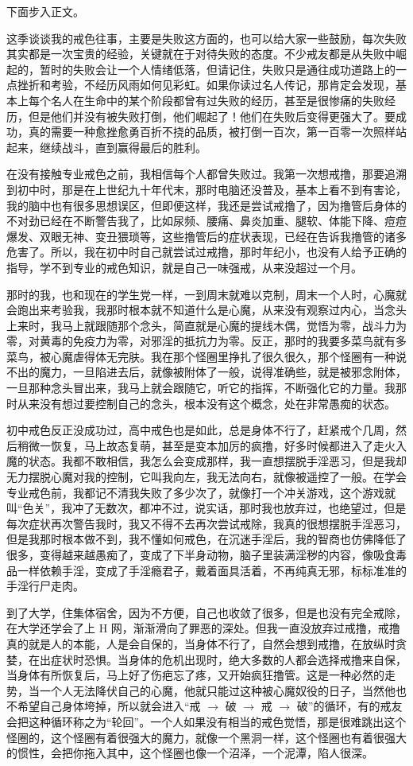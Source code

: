 下面步入正文。

这季谈谈我的戒色往事，主要是失败这方面的，也可以给大家一些鼓励，每次失败其实都是一次宝贵的经验，关键就在于对待失败的态度。不少戒友都是从失败中崛起的，暂时的失败会让一个人情绪低落，但请记住，失败只是通往成功道路上的一点挫折和考验，不经历风雨如何见彩虹。如果你读过名人传记，那肯定会发现，基本上每个名人在生命中的某个阶段都曾有过失败的经历，甚至是很惨痛的失败经历，但是他们并没有被失败打倒，他们崛起了！他们在失败后变得更强大了。要成功，真的需要一种愈挫愈勇百折不挠的品质，被打倒一百次，第一百零一次照样站起来，继续战斗，直到赢得最后的胜利。

在没有接触专业戒色之前，我相信每个人都曾失败过。我第一次想戒撸，那要追溯到初中时，那是在上世纪九十年代末，那时电脑还没普及，基本上看不到有害论，我的脑中也有很多思想误区，但即便这样，我还是尝试戒撸了，因为撸管后身体的不对劲已经在不断警告我了，比如尿频、腰痛、鼻炎加重、腿软、体能下降、痘痘爆发、双眼无神、变丑猥琐等，这些撸管后的症状表现，已经在告诉我撸管的诸多危害了。所以，我在初中时自己就尝试过戒撸，那时年纪小，也没有人给予正确的指导，学不到专业的戒色知识，就是自己一味强戒，从来没超过一个月。

那时的我，也和现在的学生党一样，一到周末就难以克制，周末一个人时，心魔就会跑出来考验我，我那时根本就不知道什么是心魔，从来没有观察过内心，当念头上来时，我马上就跟随那个念头，简直就是心魔的提线木偶，觉悟为零，战斗力为零，对黄毒的免疫力为零，对邪淫的抵抗力为零。反正，那时的我要多菜鸟就有多菜鸟，被心魔虐得体无完肤。我在那个怪圈里挣扎了很久很久，那个怪圈有一种说不出的魔力，一旦陷进去后，就像被附体了一般，说得准确些，就是被邪念附体，一旦那种念头冒出来，我马上就会跟随它，听它的指挥，不断强化它的力量。我那时从来没有想过要控制自己的念头，根本没有这个概念，处在非常愚痴的状态。

初中戒色反正没成功过，高中戒色也是如此，总是身体不行了，赶紧戒个几周，然后稍微一恢复，马上故态复萌，甚至是变本加厉的疯撸，好多时候都进入了走火入魔的状态。我都不敢相信，我怎么会变成那样，我一直想摆脱手淫恶习，但是我却无力摆脱心魔对我的控制，它叫我向左，我无法向右，就像被遥控了一般。在学会专业戒色前，我都记不清我失败了多少次了，就像打一个冲关游戏，这个游戏就叫“色关”，我冲了无数次，都冲不过，说实话，那时我也放弃过，也绝望过，但是每次症状再次警告我时，我又不得不去再次尝试戒除，我真的很想摆脱手淫恶习，但是我那时根本做不到，我不懂如何戒色，在沉迷手淫后，我的智商也仿佛降低了很多，变得越来越愚痴了，变成了下半身动物，脑子里装满淫秽的内容，像吸食毒品一样依赖手淫，变成了手淫瘾君子，戴着面具活着，不再纯真无邪，标标准准的手淫行尸走肉。

到了大学，住集体宿舍，因为不方便，自己也收敛了很多，但是也没有完全戒除，在大学还学会了上 H 网，渐渐滑向了罪恶的深处。但我一直没放弃过戒撸，戒撸真的就是人的本能，人是会自保的，当身体不行了，自然会想到戒撸，在放纵时贪婪，在出症状时恐惧。当身体的危机出现时，绝大多数的人都会选择戒撸来自保，当身体有所恢复后，马上好了伤疤忘了疼，又开始疯狂撸管。这是一种必然的走势，当一个人无法降伏自己的心魔，他就只能过这种被心魔奴役的日子，当然他也不希望自己身体垮掉，所以就会进入“戒 $\to$ 破 $\to$ 戒 $\to$ 破”的循环，有的戒友会把这种循环称之为“轮回”。一个人如果没有相当的戒色觉悟，那是很难跳出这个怪圈的，这个怪圈有着很强大的魔力，就像一个黑洞一样，这个怪圈也有着很强大的惯性，会把你拖入其中，这个怪圈也像一个沼泽，一个泥潭，陷人很深。

